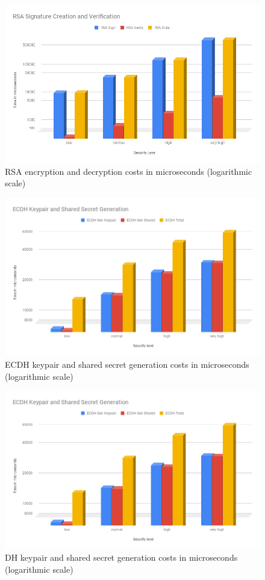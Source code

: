 				  \begin{figure}
					\centering
					\includegraphics[width=1.0\textwidth]{img/papi-rsa-sign-verify.png}
					\centering \caption{RSA encryption and decryption costs in microseconds (logarithmic scale)}
					\label{af:5}
				  \end{figure}
  
				  \begin{figure}
					\centering
					\includegraphics[width=1.0\textwidth]{img/papi-ecdh-cost.png}
					\centering \caption{ECDH keypair and shared secret generation costs in microseconds (logarithmic scale)}
					\label{af:6}
				  \end{figure}
  
				  \begin{figure}
					\centering
					\includegraphics[width=1.0\textwidth]{img/papi-ecdh-cost.png}
					\centering \caption{DH keypair and shared secret generation costs in microseconds (logarithmic scale)}
					\label{af:7}
				  \end{figure}
  